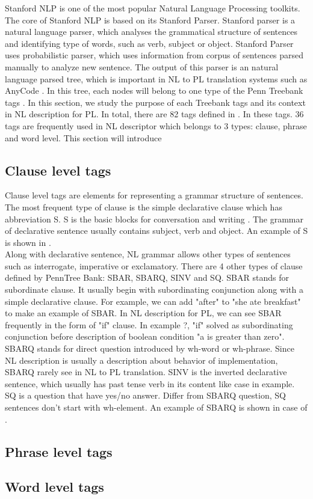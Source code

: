 Stanford NLP \cite{} is one of the most popular Natural Language Processing toolkits. The core of Stanford NLP is based on its Stanford Parser. Stanford parser is a natural language parser, which analyses the grammatical structure of sentences and identifying type of words, such as verb, subject or object. Stanford Parser uses probabilistic parser, which uses information from corpus of sentences parsed manually to analyze new sentence. The output of this parser is an natural language parsed tree, which is important in NL to PL translation systems such as AnyCode \cite{}. In this tree, each nodes will belong to one type of the Penn Treebank tags \cite{}. In this section, we study the purpose of each Treebank tags and its context in NL description for PL. In total, there are 82 tags defined in \cite{}. In these tags. 36 tags are frequently used in  NL descriptor which belongs to 3 types: clause, phrase and word level. This section will introduce 

\subsection{Clause level tags}
Clause level tags are elements for representing a grammar structure of sentences. The most frequent type of clause is the simple declarative clause which has abbreviation S. S is the basic blocks for conversation and writing \cite{}. The grammar of declarative sentence usually contains subject, verb and object. An example of S is shown in \cite{}. \\
Along with declarative sentence, NL grammar allows other types of sentences such as interrogate, imperative or exclamatory. There are 4 other types of clause defined by PennTree Bank: SBAR, SBARQ, SINV and SQ. SBAR stands for subordinate clause. It usually begin with subordinating conjunction along with a simple declarative clause. For example, we can add "after" to "she ate breakfast" to make an example of SBAR. In NL description for PL, we can see SBAR frequently in the form of "if" clause. In example ?, "if" solved as subordinating conjunction before description of boolean condition "a is greater than zero". SBARQ stands for direct question introduced by wh-word or wh-phrase. Since NL description is usually a description about behavior of implementation, SBARQ rarely see in NL to PL translation. SINV is the inverted declarative sentence, which usually has past tense verb in its content like case in example. SQ is a question that have yes/no answer. Differ from SBARQ question, SQ sentences don't start with wh-element. An example of SBARQ is shown in case of \cite{}. 
\subsection{Phrase level tags}
\subsection{Word level tags}

